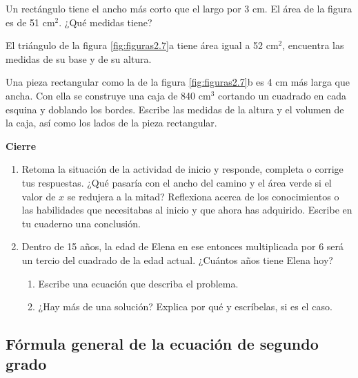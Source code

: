 \documentclass[11pt]{book}
\begin{document}
\begin{enumerate}
\begin{minipage}[t]{0.5\textwidth}
          \item Un rectángulo tiene el ancho más corto que el largo por 3 cm. El área de la figura es de 51 cm$^2$. ¿Qué medidas tiene?
          \item El triángulo de la figura \ref{fig:figuras2.7}a tiene área igual a 52 cm$^2$, encuentra las medidas de su base y de su altura.
          \item Una pieza rectangular como la de la figura \ref{fig:figuras2.7}b es 4 cm más larga que ancha. Con ella se construye una caja de 840 cm$^3$ cortando un cuadrado
          en cada esquina y doblando los bordes. Escribe las medidas de la altura y el volumen de la caja, así como los lados de la pieza rectangular.

        \end{minipage}

\end{enumerate}


\begin{boxK}
  \begin{center}\textbf{Cierre}\end{center}

  \begin{enumerate}
    \item Retoma la situación de la actividad de inicio y responde, completa o corrige
          tus respuestas. ¿Qué pasaría con el ancho del camino y el área verde si el
          valor de $x$ se redujera a la mitad?
          Reflexiona acerca de los conocimientos o las habilidades que necesitabas al
          inicio y que ahora has adquirido. Escribe en tu cuaderno una conclusión.
    \item Dentro de 15 años, la edad de Elena en ese entonces multiplicada por 6 será
          un tercio del cuadrado de la edad actual. ¿Cuántos años tiene Elena hoy?

          \begin{enumerate}
            \item Escribe una ecuación que describa el problema.
            \item ¿Hay más de una solución? Explica por qué y escríbelas, si es el caso.
          \end{enumerate}
  \end{enumerate}
\end{boxK}

\newpage

\subsection{Fórmula general de la ecuación de segundo grado}
\end{document}
